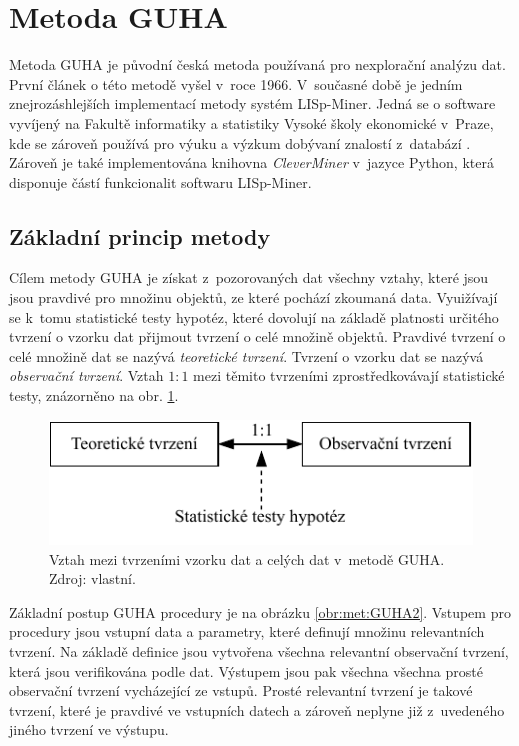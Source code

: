 \section{Metoda GUHA}
\label{sec:Teorie:Guha}

Metoda GUHA je původní česká metoda používaná pro nexplorační analýzu dat.
První článek o této metodě vyšel v~roce 1966. V~současné době je jedním znejrozáshlejších implementací metody systém LISp-Miner. Jedná se o software vyvíjený na Fakultě informatiky a statistiky Vysoké školy ekonomické v~Praze, kde se zároveň používá pro výuku a výzkum dobývaní znalostí z~databází \cite{bib:GUHA}. Zároveň je také implementována knihovna \emph{CleverMiner} v~jazyce Python, která disponuje částí funkcionalit softwaru LISp-Miner.

\subsection{Základní princip metody}

Cílem metody GUHA je získat z~pozorovaných dat všechny vztahy, které jsou jsou pravdivé pro množinu objektů, ze které pochází zkoumaná data. Vyuižívají se k~tomu statistické testy hypotéz, které dovolují na základě platnosti určitého tvrzení o vzorku dat přijmout tvrzení o celé množině objektů. Pravdivé tvrzení o celé množině dat se nazývá \emph{teoretické tvrzení}. Tvrzení o vzorku dat se nazývá \emph{observační tvrzení}. Vztah $1:1$ mezi těmito tvrzeními zprostředkovávají statistické testy, znázorněno na obr. \ref*{obr:met:GUHA1}.\cite{bib:GUHA}

\begin{figure}[hbtp!]
    \centering
    \captionsetup{justification=centering}
    \includegraphics[width=.5\textwidth]{obrazky/GUHA/GUHA1.pdf}
    \caption{Vztah mezi tvrzeními vzorku dat a celých dat v~metodě GUHA. Zdroj: vlastní.}
    \label{obr:met:GUHA1}
\end{figure}

Základní postup GUHA procedury je na obrázku \ref*{obr:met:GUHA2}. Vstupem pro procedury jsou vstupní data a parametry, které definují množinu relevantních tvrzení. Na základě definice jsou vytvořena všechna relevantní observační tvrzení, která jsou verifikována podle dat. Výstupem jsou pak všechna všechna prosté observační tvrzení vycházející ze vstupů. Prosté relevantní  tvrzení je takové tvrzení, které je pravdivé ve vstupních datech a zároveň neplyne již z~uvedeného jiného tvrzení ve výstupu.\cite{bib:GUHA}

